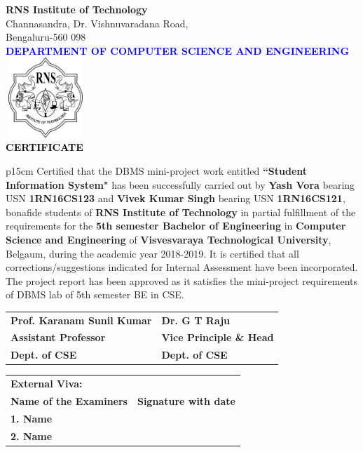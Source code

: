\thispagestyle{empty}
\begin{center}

\textup{\large {\textcolor{darkbrown}{\bf RNS Institute of Technology}} \\ 
{\normalsize{\textcolor{darkbrown}{Channasandra, Dr. Vishnuvaradana Road,\\ Bengaluru-560 098}}}}\\[0.1in]
\textup{\normalsize {\textcolor{blue}{\bf DEPARTMENT OF COMPUTER SCIENCE AND ENGINEERING}}}\\[0.1in]
\includegraphics[width=3cm, height=3cm]{./RNS_logo.png}\\[0.1in]
\textup{\large {\textcolor{black}{\textbf {CERTIFICATE}}}} \\[0.1in]
\end{center}

\justify
\begin{tabular}{p{15cm}}
\hspace{0.4cm} Certified that the DBMS mini-project work entitled \textbf{``Student Information System"} has been successfully carried out by \textbf{Yash Vora} bearing USN \textbf{1RN16CS123} and \textbf{Vivek Kumar Singh} bearing USN \textbf{1RN16CS121}, bonafide students of \textbf{RNS Institute of Technology } in partial fulfillment of the requirements for the \textbf{5th semester Bachelor of Engineering} in \textbf{Computer Science and Engineering} of \textbf{Visvesvaraya Technological University}, Belgaum, during the academic year 2018-2019. It is certified that all corrections/suggestions indicated for Internal Assessment have been incorporated. The project report has been approved as it satisfies the mini-project requirements of DBMS lab of 5th semester BE in CSE.\\[0.4in]
\end{tabular}

\justify
\begin{tabularx}{1\linewidth}{X X}
\textbf{Prof. Karanam Sunil Kumar} & {\hfill} \textbf{Dr. G T Raju}\\
\textbf{Assistant Professor} & {\hfill} \textbf{Vice Principle \& Head}\\
\textbf{Dept. of CSE} & {\hfill} \textbf{Dept. of CSE}\\
\end{tabularx}

\vfill

\justify
\begin{tabularx}{\linewidth}{X l}
\textbf{External Viva:}\\
\textbf{Name of the Examiners} & {\hfill} \textbf{Signature with date}\\
\textbf{1. Name}\\
\vfill
\textbf{2. Name}\\
\end{tabularx}
\vfill
\pagebreak